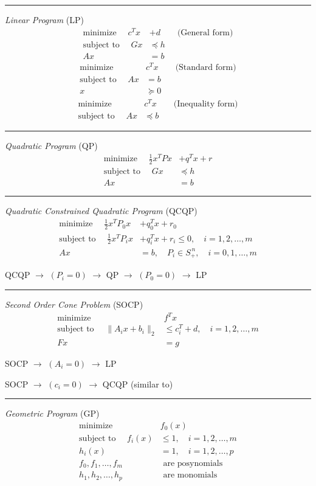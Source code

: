 \rule{\linewidth}{0.1mm}
%
\noindent
\textit{Linear Program} (LP)
%
\begin{align*}
\mbox{minimize }\quad c^Tx &+ d \qquad
\mbox{(General form)}  \\
\mbox{subject to }\quad Gx &\preceq h \\
Ax &= b
\end{align*}
%
\begin{align*}
\mbox{minimize }\quad &c^Tx \qquad
\mbox{(Standard form)} \\
\mbox{subject to }\quad Ax &= b \\
x &\succeq 0
\end{align*}
%
\begin{align*}
\mbox{minimize }\quad &c^Tx \qquad
\mbox{(Inequality form)} \\
\mbox{subject to }\quad Ax &\preceq b 
\end{align*}
\rule{\linewidth}{0.1mm}
%
\noindent
\textit{Quadratic Program} (QP)
\begin{align*}
\mbox{minimize }\quad \frac{1}{2}x^T P x &+ q^T x + r\\
\mbox{subject to }\quad Gx &\preceq h\\
Ax &= b
\end{align*}
\rule{\linewidth}{0.1mm}
%
%
\noindent
\textit{Quadratic Constrained Quadratic Program} (QCQP)
\begin{align*}
\mbox{minimize }\quad \frac{1}{2}x^T P_0 x &+ q_0^T x + r_0\\
\mbox{subject to }\quad \frac{1}{2}x^T P_i x &+ q_i^T x + r_i \le 0, 
\quad i = 1, 2, \ldots, m\\
Ax &= b, \quad P_i \in S_+^{\,n}, \quad i = 0, 1, \ldots, m
\end{align*}

QCQP \(\rightarrow\) \((P_i = 0)\) \(\rightarrow\) QP  \(\rightarrow\) 
\((P_0 = 0)\) \(\rightarrow\) LP\\
\rule{\linewidth}{0.1mm}
%
%
\noindent
\textit{Second Order Cone Problem} (SOCP)
\begin{align*}
\mbox{minimize }\quad &f^T x\\
\mbox{subject to }\quad \| A_i x + b_i\|_2 &\le c_i^T + d, \quad i = 1, 2, \ldots, m\\
Fx &= g
\end{align*}

SOCP \(\rightarrow\) \((A_i = 0)\) \(\rightarrow\) LP

SOCP \(\rightarrow\) \((c_i = 0)\) \(\rightarrow\) QCQP (similar to)\\
\rule{\linewidth}{0.1mm}
%
%
\noindent
\textit{Geometric Program} (GP)
\begin{align*}
\mbox{minimize }\quad &f_0(x)\\
\mbox{subject to }\quad f_i(x) &\le 1, \quad i = 1, 2, \ldots, m\\
h_i(x) &= 1, \quad i = 1, 2, \ldots, p\\
f_0, f_1,\ldots, f_m & \mbox{ are posynomials}\\
h_1, h_2,\ldots, h_p & \mbox{ are monomials}
\end{align*}

